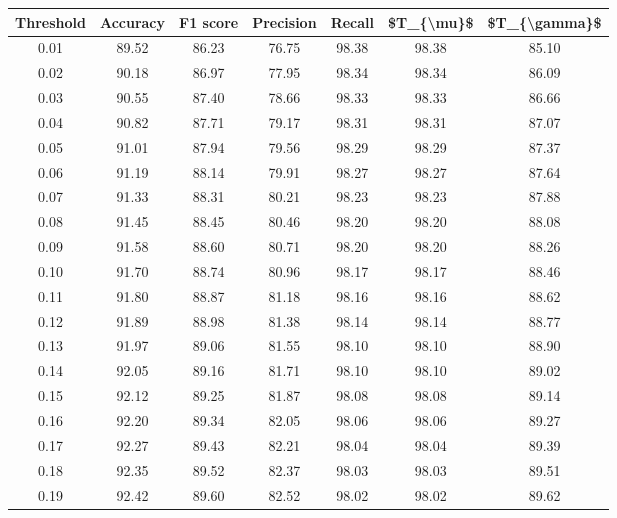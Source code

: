 \begin{tabular}{|c|c|c|c|c|c|c|}
\hline
 Threshold &  Accuracy &  F1 score &  Precision &  Recall &  \$T\_\{\textbackslash mu\}\$ &  \$T\_\{\textbackslash gamma\}\$ \\
\hline
      0.01 &     89.52 &     86.23 &      76.75 &   98.38 &      98.38 &         85.10 \\
      0.02 &     90.18 &     86.97 &      77.95 &   98.34 &      98.34 &         86.09 \\
      0.03 &     90.55 &     87.40 &      78.66 &   98.33 &      98.33 &         86.66 \\
      0.04 &     90.82 &     87.71 &      79.17 &   98.31 &      98.31 &         87.07 \\
      0.05 &     91.01 &     87.94 &      79.56 &   98.29 &      98.29 &         87.37 \\
      0.06 &     91.19 &     88.14 &      79.91 &   98.27 &      98.27 &         87.64 \\
      0.07 &     91.33 &     88.31 &      80.21 &   98.23 &      98.23 &         87.88 \\
      0.08 &     91.45 &     88.45 &      80.46 &   98.20 &      98.20 &         88.08 \\
      0.09 &     91.58 &     88.60 &      80.71 &   98.20 &      98.20 &         88.26 \\
      0.10 &     91.70 &     88.74 &      80.96 &   98.17 &      98.17 &         88.46 \\
      0.11 &     91.80 &     88.87 &      81.18 &   98.16 &      98.16 &         88.62 \\
      0.12 &     91.89 &     88.98 &      81.38 &   98.14 &      98.14 &         88.77 \\
      0.13 &     91.97 &     89.06 &      81.55 &   98.10 &      98.10 &         88.90 \\
      0.14 &     92.05 &     89.16 &      81.71 &   98.10 &      98.10 &         89.02 \\
      0.15 &     92.12 &     89.25 &      81.87 &   98.08 &      98.08 &         89.14 \\
      0.16 &     92.20 &     89.34 &      82.05 &   98.06 &      98.06 &         89.27 \\
      0.17 &     92.27 &     89.43 &      82.21 &   98.04 &      98.04 &         89.39 \\
      0.18 &     92.35 &     89.52 &      82.37 &   98.03 &      98.03 &         89.51 \\
      0.19 &     92.42 &     89.60 &      82.52 &   98.02 &      98.02 &         89.62 \\

\end{tabular}
